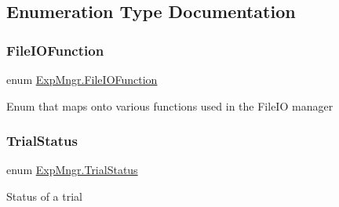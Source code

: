 \subsection{Enumeration Type Documentation}
\mbox{\label{namespace_exp_mngr_ada658a3bceadc7d2f4be3a749edae819}} 
\subsubsection{\texorpdfstring{File\+I\+O\+Function}{FileIOFunction}}
{\footnotesize\ttfamily enum \hyperlink{namespace_exp_mngr_ada658a3bceadc7d2f4be3a749edae819}{Exp\+Mngr.\+File\+I\+O\+Function}\hspace{0.3cm}{\ttfamily [strong]}}



Enum that maps onto various functions used in the File\+IO manager 

\mbox{\label{namespace_exp_mngr_a8a72f39778ead3dc04af13a60949175c}} 
\subsubsection{\texorpdfstring{Trial\+Status}{TrialStatus}}
{\footnotesize\ttfamily enum \hyperlink{namespace_exp_mngr_a8a72f39778ead3dc04af13a60949175c}{Exp\+Mngr.\+Trial\+Status}\hspace{0.3cm}{\ttfamily [strong]}}



Status of a trial 

